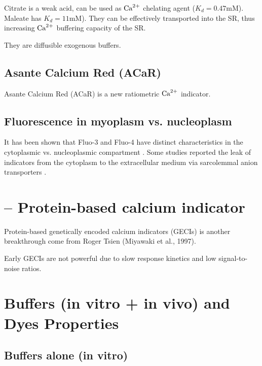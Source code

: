 Citrate is a weak acid, can be used as ${\text{Ca}^{2+}}$ chelating agent
($K_d=0.47$mM). Maleate has $K_d=11$mM). They can be effectively
transported into the SR, thus increasing ${\text{Ca}^{2+}}$ buffering capacity of
the SR.

They are diffusible exogenous buffers.

\subsection{Asante Calcium Red (ACaR)}

Asante Calcium Red (ACaR) is a new ratiometric ${\text{Ca}^{2+}}$ indicator. 

\subsection{Fluorescence in myoplasm vs. nucleoplasm}

It has been shown that Fluo-3 and Fluo-4 have distinct characteristics in the
cytoplasmic vs. nucleoplasmic compartment \citep{thomas2000}. Some studies
reported the leak of indicators from the cytoplasm to the extracellular medium
via sarcolemmal anion transporters \citep{mcdonough1989,mitsui1993}.

\section{-- Protein-based calcium indicator}
\label{sec:calcium-indicator-protein-based}

Protein-based genetically encoded calcium indicators (GECIs) is another
breakthrough come from Roger Tsien (Miyawaki et al., 1997).

Early GECIs are not powerful due to slow response kinetics and low
signal-to-noise ratios.



\section{Buffers (in vitro + in vivo) and Dyes Properties}
\label{sec:buffers-dyes}

\subsection{Buffers alone (in vitro)}

